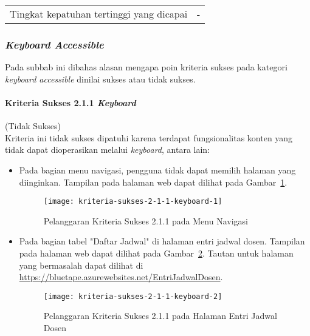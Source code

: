 \begin{center}
\begin{longtable}{|c|c|c|}
    \hline
    \multicolumn{2}{|c|}{Tingkat kepatuhan tertinggi yang dicapai} & - \\

\end{longtable}
\end{center}

\subsubsection{\textit{Keyboard Accessible}}
\label{subsubsec:kepatuhan_bluetape_keyboard_accessible}
Pada subbab ini dibahas alasan mengapa poin kriteria sukses pada kategori \textit{keyboard accessible} dinilai sukses atau tidak sukses.

\paragraph{Kriteria Sukses 2.1.1 \textit{Keyboard}}
\label{par:kepatuhan_bluetape_kriteria_sukses_2.1.1}
(Tidak Sukses)\\

Kriteria ini tidak sukses dipatuhi karena terdapat fungsionalitas konten yang tidak dapat dioperasikan melalui \textit{keyboard}, antara lain:

\begin{itemize}
    \item Pada bagian menu navigasi, pengguna tidak dapat memilih halaman yang diinginkan. Tampilan pada halaman web dapat dilihat pada \mbox{Gambar \ref{fig:2.1.1_keyboard_1}}.
    \begin{figure}[H]
        \centering  
        \texttt{[image: kriteria-sukses-2-1-1-keyboard-1]}  
        \caption[Pelanggaran Kriteria Sukses 2.1.1 pada Menu Navigasi]{Pelanggaran Kriteria Sukses 2.1.1 pada Menu Navigasi}
        \label{fig:2.1.1_keyboard_1}  
    \end{figure} 

    \item Pada bagian tabel "Daftar Jadwal" di halaman entri jadwal dosen. Tampilan pada halaman web dapat dilihat pada \mbox{Gambar \ref{fig:2.1.1_keyboard_2}}. Tautan untuk halaman yang bermasalah dapat dilihat di \url{https://bluetape.azurewebsites.net/EntriJadwalDosen}.
    \begin{figure}[H]
        \centering  
        \texttt{[image: kriteria-sukses-2-1-1-keyboard-2]}  
        \caption[Pelanggaran Kriteria Sukses 2.1.1 pada Halaman Entri Jadwal Dosen]{Pelanggaran Kriteria Sukses 2.1.1 pada Halaman Entri Jadwal Dosen}
        \label{fig:2.1.1_keyboard_2}  
    \end{figure} 
\end{itemize}

